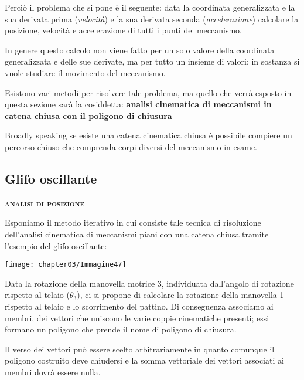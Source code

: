 			Perciò il problema che si pone è il seguente: data la coordinata generalizzata e la sua derivata prima (\emph{velocità}) e la sua derivata seconda (\emph{accelerazione}) calcolare la posizione, velocità e accelerazione di tutti i punti del meccanismo.
			
			In genere questo calcolo non viene fatto per un solo valore della coordinata generalizzata e delle sue derivate, ma per tutto un insieme di valori; in sostanza si vuole studiare il movimento del meccanismo.
			
			Esistono vari metodi per risolvere tale problema, ma quello che verrà esposto in questa sezione sarà la cosiddetta: \textbf{analisi cinematica di meccanismi in catena chiusa con il poligono di chiusura}
			
			Broadly speaking se esiste una catena cinematica chiusa è possibile compiere un percorso chiuso che comprenda corpi diversi del meccanismo in esame.
			
			\subsection{Glifo oscillante}
			\begin{center}
				{\scshape{\bfseries analisi di posizione}}
			\end{center}
			Esponiamo il metodo iterativo in cui consiste tale tecnica di risoluzione dell'analisi cinematica di meccanismi piani con una catena chiusa tramite l'esempio del glifo oscillante:\newline
			
			\begin{minipage}{.5\textwidth}
				\centering
				\texttt{[image: chapter03/Immagine47]}
			\end{minipage}
			\hfill
			\begin{minipage}{.5\textwidth}
			Data la rotazione della manovella motrice 3, individuata dall'angolo di rotazione rispetto al telaio ($\theta_3$), ci si propone di calcolare la rotazione della manovella 1 rispetto al telaio e lo scorrimento del pattino.
			Di conseguenza associamo ai membri, dei vettori che uniscono le varie coppie cinematiche presenti; essi formano un poligono che prende il nome di poligono di chiusura.
			\end{minipage}
			\vspace{2mm}
			
			
				Il verso dei vettori può essere scelto arbitrariamente in quanto comunque il poligono costruito deve chiudersi e la somma vettoriale dei vettori associati ai membri dovrà essere nulla.
				
